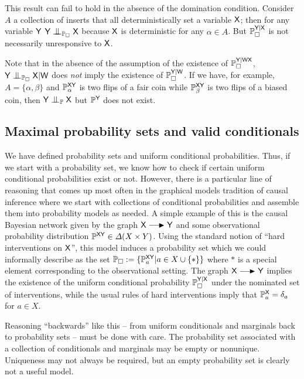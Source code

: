 This result can fail to hold in the absence of the domination condition. Consider $A$ a collection of inserts that all deterministically set a variable $\mathsf{X}$; then for any variable $\mathsf{Y}$ $\RV{Y}\CI_{\prob{P}_\square} \RV{X}$ because $\mathsf{X}$ is deterministic for any $\alpha\in A$. But $\mathbb{P}_\square^{\mathsf{Y}|\mathsf{X}}$ is not necessarily unresponsive to $\mathsf{X}$.

Note that in the absence of the assumption of the existence of $\mathbb{P}_\square^{\mathsf{Y}|\mathsf{WX}}$, $\RV{Y}\CI_{\prob{P}_\square}\RV{X}|\RV{W}$ does \emph{not} imply the existence of $\mathbb{P}_\square^{\mathsf{Y}|\mathsf{W}}$. If we have, for example, $A=\{\alpha,\beta\}$ and $\mathbb{P}_\alpha^{\mathsf{XY}}$ is two flips of a fair coin while $\mathbb{P}_\beta^{\mathsf{XY}}$ is two flips of a biased coin, then $\RV{Y}\CI_{\prob{P}}\RV{X}$ but $\mathbb{P}^{\mathsf{Y}}$ does not exist.

\subsection{Maximal probability sets and valid conditionals}

We have defined probability sets and uniform conditional probabilities. Thus, if we start with a probability set, we know how to check if certain uniform conditional probabilities exist or not. However, there is a particular line of reasoning that comes up most often in the graphical models tradition of causal inference where we start with collections of conditional probabilities and assemble them into probability models as needed. A simple example of this is the causal Bayesian network given by the graph $\RV{X}\longrightarrowRHD \RV{Y}$ and some observational probability distribution $\mathbb{P}^{\mathsf{XY}}\in\Delta(X\times Y)$. Using the standard notion of ``hard interventions on $\mathsf{X}$'', this model induces a probability set which we could informally describe as the set $\mathbb{P}_\square:=\{\mathbb{P}_a^{\mathsf{XY}}|a\in X\cup\{*\}\}$ where $*$ is a special element corresponding to the observational setting. The graph $\RV{X}\longrightarrowRHD \RV{Y}$ implies the existence of the uniform conditional probability $\mathbb{P}_\square^{\mathsf{Y}|\mathsf{X}}$ under the nominated set of interventions, while the usual rules of hard interventions imply that $\mathbb{P}_a^{\mathsf{X}} = \delta_a$ for $a\in X$.

Reasoning ``backwards'' like this -- from uniform conditionals and marginals back to probability sets -- must be done with care. The probability set associated with a collection of conditionals and marginals may be empty or nonunique. Uniqueness may not always be required, but an empty probability set is clearly not a useful model.

